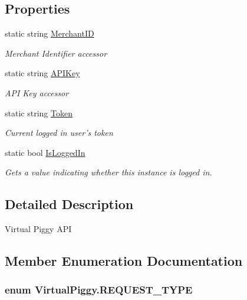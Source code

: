 \subsection*{Properties}
\begin{DoxyCompactItemize}
\item 
static string \hyperlink{class_virtual_piggy_a1dbe43b28ff22f55ee3be3b6eb54def1}{Merchant\-I\-D}
\begin{DoxyCompactList}\small\item\em Merchant Identifier accessor \end{DoxyCompactList}\item 
static string \hyperlink{class_virtual_piggy_a01aab4ab653d5d9ca572d28ff5d63aa8}{A\-P\-I\-Key}
\begin{DoxyCompactList}\small\item\em A\-P\-I Key accessor \end{DoxyCompactList}\item 
static string \hyperlink{class_virtual_piggy_a27549028a152d40ddf293705da935a9b}{Token}
\begin{DoxyCompactList}\small\item\em Current logged in user's token \end{DoxyCompactList}\item 
static bool \hyperlink{class_virtual_piggy_af0ab9dea29cfb35855cd75d80a652900}{Is\-Logged\-In}
\begin{DoxyCompactList}\small\item\em Gets a value indicating whether this instance is logged in. \end{DoxyCompactList}\end{DoxyCompactItemize}


\subsection{Detailed Description}
Virtual Piggy A\-P\-I 



\subsection{Member Enumeration Documentation}
\hypertarget{class_virtual_piggy_adca55d9dcf3fd7482dacac0ec3258afd}{
\subsubsection[{R\-E\-Q\-U\-E\-S\-T\-\_\-\-T\-Y\-P\-E}]{\setlength{\rightskip}{0pt plus 5cm}enum {\bf Virtual\-Piggy.\-R\-E\-Q\-U\-E\-S\-T\-\_\-\-T\-Y\-P\-E}}}\label{class_virtual_piggy_adca55d9dcf3fd7482dacac0ec3258afd}


